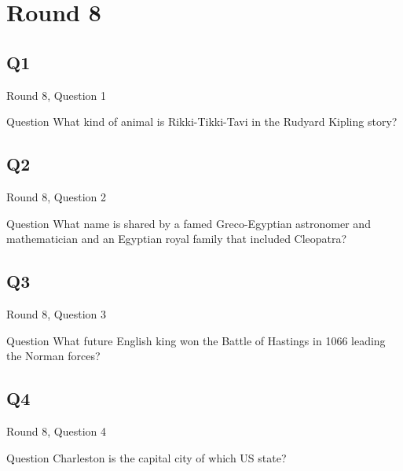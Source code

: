 \documentclass[11pt]{beamer}
\begin{document}
\section{Round 8}
    

\subsection*{Q1}
\begin{frame}[t]{Round 8, Question 1}
\vspace{2em}
\begin{block}{Question}
What kind of animal is Rikki-Tikki-Tavi in the Rudyard Kipling story\@?
\end{block}
\end{frame}
    

\subsection*{Q2}
\begin{frame}[t]{Round 8, Question 2}
\vspace{2em}
\begin{block}{Question}
What name is shared by a famed Greco-Egyptian astronomer and mathematician and an Egyptian royal family that included Cleopatra\@?
\end{block}
\end{frame}
    

\subsection*{Q3}
\begin{frame}[t]{Round 8, Question 3}
\vspace{2em}
\begin{block}{Question}
What future English king won the Battle of Hastings in 1066 leading the Norman forces\@?
\end{block}
\end{frame}
    

\subsection*{Q4}
\begin{frame}[t]{Round 8, Question 4}
\vspace{2em}
\begin{block}{Question}
Charleston is the capital city of which US state\@?
\end{block}
\end{frame}
    
\end{document}
